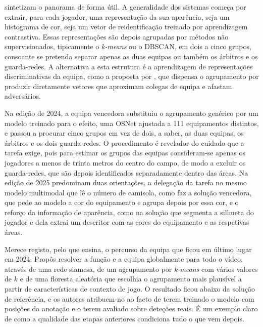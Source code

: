 \citet{golovkin2025minimap} sintetizam o panorama de forma útil. A generalidade dos sistemas
começa por extrair, para cada jogador, uma representação da sua aparência, seja um histograma
de cor, seja um vetor de reidentificação treinado por aprendizagem contrastiva. Essas
representações são depois agrupadas por métodos não supervisionados, tipicamente o
\emph{k-means} ou o DBSCAN, em dois a cinco grupos, consoante se pretenda separar apenas as
duas equipas ou também os árbitros e os guarda-redes. A alternativa a esta estrutura é a
aprendizagem de representações discriminativas da equipa, como a proposta por
\citet{istasse2019associative}, que dispensa o agrupamento por produzir diretamente vetores
que aproximam colegas de equipa e afastam adversários.

Na edição de 2024, a equipa vencedora substituiu o agrupamento genérico por um modelo
treinado para o efeito, uma OSNet ajustada a 111 equipamentos distintos, e passou a procurar
cinco grupos em vez de dois, a saber, as duas equipas, os árbitros e os dois guarda-redes. O
procedimento é revelador do cuidado que a tarefa exige, pois para estimar os grupos das
equipas consideram-se apenas os jogadores a menos de trinta metros do centro do campo, de
modo a excluir os guarda-redes, que são depois identificados separadamente dentro das áreas.
Na edição de 2025 predominam duas orientações, a delegação da tarefa no mesmo modelo
multimodal que lê o número de camisola, como faz a solução vencedora, que pede ao modelo a
cor do equipamento e agrupa depois por essa cor, e o reforço da informação de aparência,
como na solução que segmenta a silhueta do jogador e dela extrai um descritor com as cores do
equipamento e as respetivas áreas.

Merece registo, pelo que ensina, o percurso da equipa que ficou em último lugar em 2024.
Propôs resolver a função e a equipa globalmente para todo o vídeo, através de uma rede
siamesa, de um agrupamento por \emph{k-means} com vários valores de $k$ e de uma floresta
aleatória que escolhia o agrupamento mais plausível a partir de características de contexto
de jogo. O resultado ficou abaixo da solução de referência, e os autores atribuem-no ao facto
de terem treinado o modelo com posições da anotação e o terem avaliado sobre deteções reais.
É um exemplo claro de como a qualidade das etapas anteriores condiciona tudo o que vem
depois.

